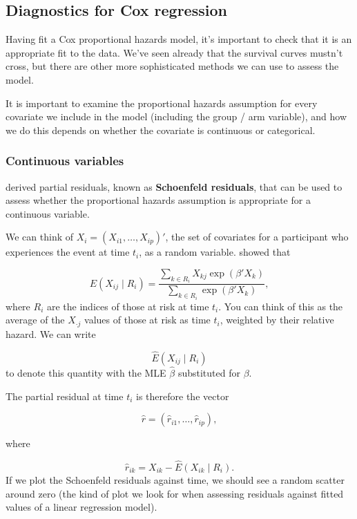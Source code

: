 \documentclass[
  openany]{book}
\theoremstyle{definition}
\theoremstyle{definition}
\theoremstyle{definition}
\theoremstyle{definition}
\theoremstyle{remark}
\begin{document}
\subsection{Diagnostics for Cox regression}\label{diagnostics-for-cox-regression}

Having fit a Cox proportional hazards model, it's important to check that it is an appropriate fit to the data. We've seen already that the survival curves mustn't cross, but there are other more sophisticated methods we can use to assess the model.

It is important to examine the proportional hazards assumption for every covariate we include in the model (including the group / arm variable), and how we do this depends on whether the covariate is continuous or categorical.

\subsubsection{Continuous variables}\label{continuous-variables}

\citet{schoenfeld1982partial} derived partial residuals, known as \textbf{Schoenfeld residuals}, that can be used to assess whether the proportional hazards assumption is appropriate for a continuous variable.

We can think of \(X_i = \left(X_{i1},\ldots,X_{ip}\right)'\), the set of covariates for a participant who experiences the event at time \(t_i\), as a random variable. \citet{schoenfeld1982partial} showed that

\[E\left(X_{ij}\mid{R_i}\right) = \frac{\sum\limits_{k\in{R_i}}X_{kj}\exp\left(\beta'X_k\right)}{\sum\limits_{k\in{R_i}}\exp\left(\beta'X_k\right)}, \]
where \(R_i\) are the indices of those at risk at time \(t_i\). You can think of this as the average of the \(X_{\cdot j}\) values of those at risk as time \(t_i\), weighted by their relative hazard. We can write

\[ \hat{E}\left(X_{ij}\mid R_i\right)\]
to denote this quantity with the MLE \(\hat\beta\) substituted for \(\beta\).

The partial residual at time \(t_i\) is therefore the vector

\[\hat{r} = \left(\hat{r}_{i1},\ldots,\hat{r}_{ip}\right), \]

where

\[\hat{r}_{ik} = X_{ik} - \hat{E}\left(X_{ik}\mid{R_i}\right). \]
If we plot the Schoenfeld residuals against time, we should see a random scatter around zero (the kind of plot we look for when assessing residuals against fitted values of a linear regression model).
\end{document}
